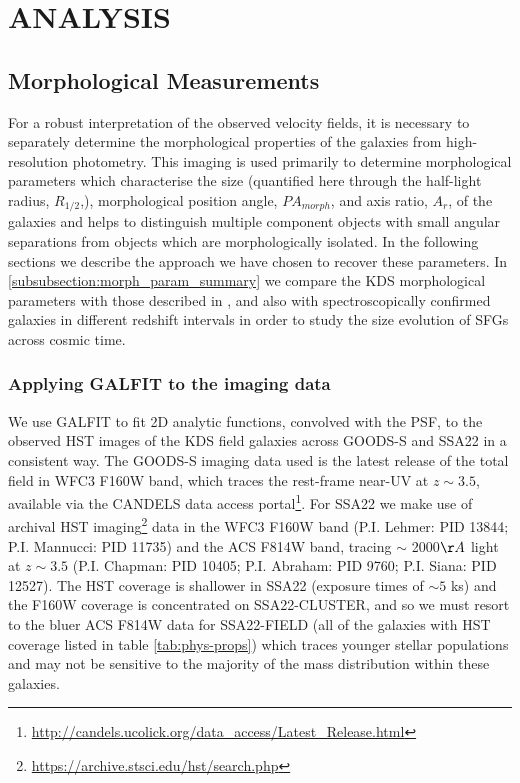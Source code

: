 \documentclass[fleqn,usenatbib]{mn2e}
\begin{document}
\section{ANALYSIS}\label{sec:analysis}



\subsection{Morphological Measurements}\label{subsec:morphological_measurements}
For a robust interpretation of the observed velocity fields, it is necessary to separately determine the morphological properties of the galaxies from high-resolution photometry.
This imaging is used primarily to determine morphological parameters which characterise the size (quantified here through the half-light radius, $R_{1/2}$,), morphological position angle, $PA_{morph}$, and axis ratio, $A_{r}$, of the galaxies and helps to distinguish multiple component objects with small angular separations from objects which are morphologically isolated.
In the following sections we describe the approach we have chosen to recover these parameters.
In \cref{subsubsection:morph_param_summary} we compare the KDS morphological parameters with those described in \cite{VanderWel2012}, and also with spectroscopically confirmed galaxies in different redshift intervals in order to study the size evolution of SFGs across cosmic time.

\subsubsection{Applying GALFIT to the imaging data}\label{subsubsec:galfitting}
We use GALFIT \citep{Peng2010_galfit} to fit 2D analytic functions, convolved with the PSF, to the observed HST images of the KDS field galaxies across GOODS-S and SSA22 in a consistent way.
The GOODS-S imaging data used is the latest release of the total field in WFC3 F160W band, which traces the rest-frame near-UV at $z \sim 3.5$, available via the CANDELS \citep{Grogin2011,Koekemoer2011} data access portal\footnote{\url{http://candels.ucolick.org/data_access/Latest_Release.html}}.
For SSA22 we make use of archival HST imaging\footnote{\url{https://archive.stsci.edu/hst/search.php}} data in the WFC3 F160W band (P.I. Lehmer: PID 13844; P.I. Mannucci: PID 11735) and the ACS F814W band, tracing $\sim$ 2000$\AA$ light at $z\sim 3.5$ (P.I. Chapman: PID 10405; P.I. Abraham: PID 9760; P.I. Siana: PID 12527).
The HST coverage is shallower in SSA22 (exposure times of $\sim 5$ ks) and the F160W coverage is concentrated on SSA22-CLUSTER, and so we must resort to the bluer ACS F814W data for SSA22-FIELD (all of the galaxies with HST coverage listed in table \ref{tab:phys-props}) which traces younger stellar populations and may not be sensitive to the majority of the mass distribution within these galaxies. \\
\end{document}
